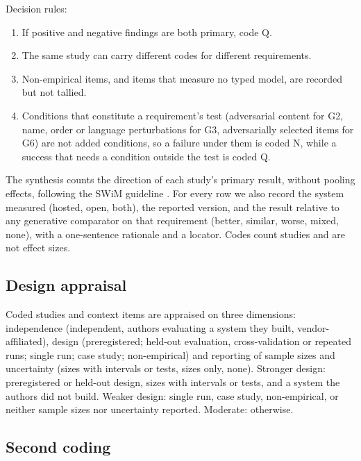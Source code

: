 Decision rules:
\begin{enumerate}[label=(\roman*)]
\item If positive and negative findings are both primary, code Q.
\item The same study can carry different codes for different requirements.
\item Non-empirical items, and items that measure no typed model, are recorded but not tallied.
\item Conditions that constitute a requirement's test (adversarial content for G2, name, order or language perturbations for G3, adversarially selected items for G6) are not added conditions, so a failure under them is coded N, while a success that needs a condition outside the test is coded Q.
\end{enumerate}
The synthesis counts the direction of each study's primary result, without pooling effects, following the SWiM guideline \cite{campbell2020swim}. For every row we also record the system measured (hosted, open, both), the reported \jev{} version, and the result relative to any generative comparator on that requirement (better, similar, worse, mixed, none), with a one-sentence rationale and a locator. Codes count studies and are not effect sizes.

\subsection{Design appraisal}\label{app:B4}

Coded studies and context items are appraised on three dimensions: independence (independent, authors evaluating a system they built, vendor-affiliated), design (preregistered; held-out evaluation, cross-validation or repeated runs; single run; case study; non-empirical) and reporting of sample sizes and uncertainty (sizes with intervals or tests, sizes only, none). Stronger design: preregistered or held-out design, sizes with intervals or tests, and a system the authors did not build. Weaker design: single run, case study, non-empirical, or neither sample sizes nor uncertainty reported. Moderate: otherwise.

\subsection{Second coding}\label{app:B5}

